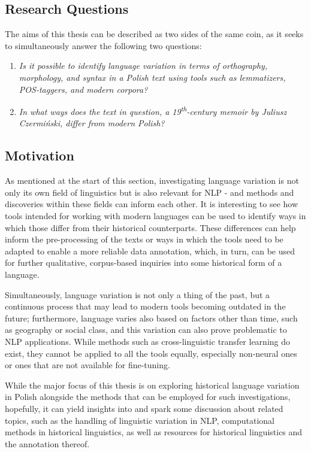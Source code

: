 \subsection{Research Questions}
\label{subsec:research-questions}

The aims of this thesis can be described as two sides of the same coin, as it seeks to simultaneously answer the following two questions:
\begin{enumerate}
    \item \textit{Is it possible to identify language variation in terms of orthography, morphology, and syntax in a Polish text using tools such as lemmatizers, POS-taggers, and modern corpora?}
    \item \textit{In what ways does the text in question, a 19\textsuperscript{th}-century memoir by Juliusz Czermiński, differ from modern Polish?}
\end{enumerate}

\subsection{Motivation}
\label{subsec:motivation}

As mentioned at the start of this section, investigating language variation is not only its own field of linguistics but is also relevant for NLP - and methods and discoveries within these fields can inform each other. It is interesting to see how tools intended for working with modern languages can be used to identify ways in which those differ from their historical counterparts. These differences can help inform the pre-processing of the texts or ways in which the tools need to be adapted to enable a more reliable data annotation, which, in turn, can be used for further qualitative, corpus-based inquiries into some historical form of a language. 

Simultaneously, language variation is not only a thing of the past, but a continuous process that may lead to modern tools becoming outdated in the future; furthermore, language varies also based on factors other than time, such as geography or social class, and this variation can also prove problematic to NLP applications. While methods such as cross-linguistic transfer learning do exist, they cannot be applied to all the tools equally, especially non-neural ones or ones that are not available for fine-tuning.

While the major focus of this thesis is on exploring historical language variation in Polish alongside the methods that can be employed for such investigations, hopefully, it can yield insights into and spark some discussion about related topics, such as the handling of linguistic variation in NLP, computational methods in historical linguistics, as well as resources for historical linguistics and the annotation thereof.

